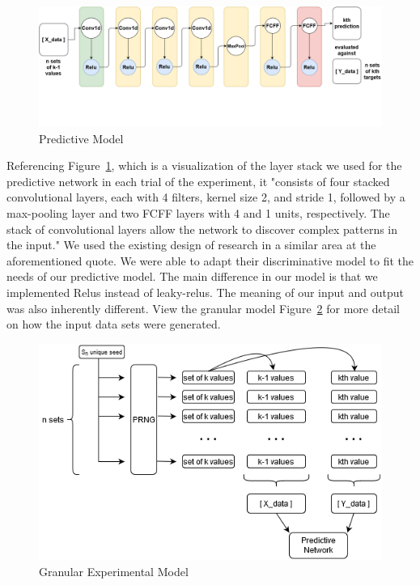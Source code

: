 \documentclass[conference]{IEEEtran}
\begin{document}
\begin{figure}[H]
\centering
\includegraphics[width=1\linewidth]{./Images/PredictiveModel.png}
\caption{Predictive Model}
\label{fig:Predictive Model}
\end{figure}

Referencing Figure~\ref{fig:Predictive Model}, which is a visualization of the layer stack we used for the predictive network in each trial of the experiment, it "consists of four stacked convolutional layers, each with 4 filters, kernel size 2, and stride 1, followed by a max-pooling layer and two FCFF layers with 4 and 1 units, respectively. The stack of convolutional layers allow the network to discover complex patterns in the input." \cite{debernardi2018pseudo} We used the existing design of research in a similar area at the aforementioned quote. We were able to adapt their discriminative model to fit the needs of our predictive model. The main difference in our model is that we implemented Relus instead of leaky-relus. The meaning of our input and output was also inherently different. View the granular model Figure~\ref{fig:Granular Experimental Model} for more detail on how the input data sets were generated.

\begin{figure}[H]
\centering
\includegraphics[width=1\linewidth]{./Images/GranularModel.png}
\caption{Granular Experimental Model}
\label{fig:Granular Experimental Model}
\end{figure}
\end{document}
